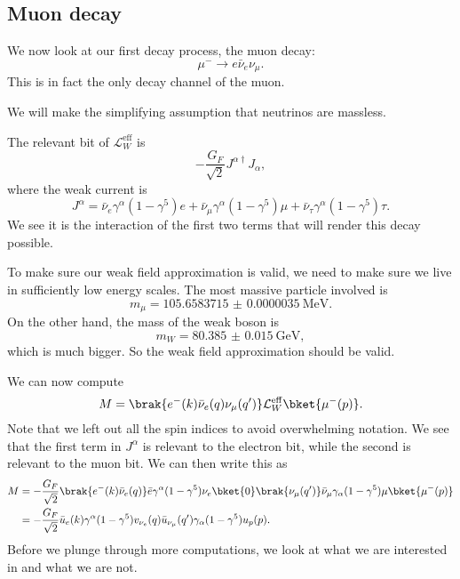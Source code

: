 \documentclass[a4paper]{article}
\begin{document}
\subsection{Muon decay}
We now look at our first decay process, the muon decay:
\[
  \mu^- \to e \bar{\nu}_e \nu_\mu.
\]
This is in fact the only decay channel of the muon.
\begin{center}
\end{center}
We will make the simplifying assumption that neutrinos are massless.

The relevant bit of $\mathcal{L}_W^{\mathrm{eff}}$ is
\[
  - \frac{G_F}{\sqrt{2}} J^{\alpha\dagger}J_\alpha,
\]
where the weak current is
\[
  J^\alpha = \bar{\nu}_e \gamma^\alpha (1 - \gamma^5) e + \bar{\nu}_\mu \gamma^\alpha(1 - \gamma^5)\mu + \bar{\nu}_\tau \gamma^\alpha(1 - \gamma^5) \tau.
\]
We see it is the interaction of the first two terms that will render this decay possible.

To make sure our weak field approximation is valid, we need to make sure we live in sufficiently low energy scales. The most massive particle involved is
\[
  m_\mu = \SI{105.6583715(35)}{\mega\electronvolt}.
\]
On the other hand, the mass of the weak boson is
\[
  m_W = \SI{80.385(15)}{\giga\electronvolt},
\]
which is much bigger. So the weak field approximation should be valid.

We can now compute
\[
  M = \brak{e^-(k) \bar{\nu}_e (q) \nu_\mu(q')} \mathcal{L}_W^{\mathrm{eff}} \bket{\mu^-(p)}.
\]
Note that we left out all the spin indices to avoid overwhelming notation. We see that the first term in $J^\alpha$ is relevant to the electron bit, while the second is relevant to the muon bit. We can then write this as
\begin{align*}
  M &= -\frac{G_F}{\sqrt{2}} \brak{e^-(k) \bar{\nu}_e(q)} \bar{e} \gamma^\alpha (1 - \gamma^5) \nu_e \bket{0} \brak{\nu_\mu(q')} \bar{\nu}_\mu \gamma_\alpha(1 - \gamma^5) \mu \bket{\mu^-(p)}\\
  &= - \frac{G_F}{\sqrt{2}} \bar{u}_e(k) \gamma^\alpha (1 - \gamma^5)v_{\nu_e}(q) \bar{u}_{\nu_\mu} (q') \gamma_\alpha (1 - \gamma^5) u_p(p).
\end{align*}
Before we plunge through more computations, we look at what we are interested in and what we are not.
\end{document}
